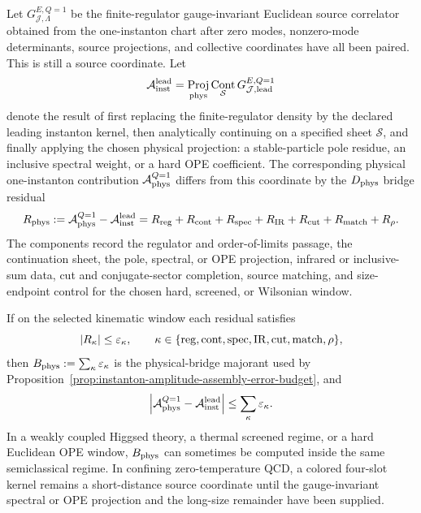 \begin{controlledapproximation}
\label{ca:instanton-euclidean-to-physical-amplitude-budget}
Let \(G^{E,Q=1}_{\mathcal J,\Lambda}\) be the finite-regulator
gauge-invariant Euclidean source correlator obtained from the one-instanton
chart after zero modes, nonzero-mode determinants, source projections, and
collective coordinates have all been paired.  This is still a source
coordinate.  Let
\[
  \mathcal A_{\rm inst}^{\rm lead}
  =
  \operatorname*{Proj}_{\rm phys}
  \operatorname*{Cont}_{\mathcal S}
  G^{E,Q=1}_{\mathcal J,{\rm lead}}
\]
denote the result of first replacing the finite-regulator density by the
declared leading instanton kernel, then analytically continuing on a specified
sheet \(\mathcal S\), and finally applying the chosen physical projection:
a stable-particle pole residue, an inclusive spectral weight, or a hard OPE
coefficient.  The corresponding physical one-instanton contribution
\(\mathcal A_{\rm phys}^{Q=1}\) differs from this coordinate by the
\(D_{\rm phys}\) bridge residual
\begin{equation}
  R_{\rm phys}
  :=
  \mathcal A_{\rm phys}^{Q=1}-\mathcal A_{\rm inst}^{\rm lead}
  =
  R_{\rm reg}
  +
  R_{\rm cont}
  +
  R_{\rm spec}
  +
  R_{\rm IR}
  +
  R_{\rm cut}
  +
  R_{\rm match}
  +
  R_{\rho}.
  \label{eq:instanton-euclidean-to-physical-residual-budget}
\end{equation}
The components record the regulator and order-of-limits passage, the
continuation sheet, the pole, spectral, or OPE projection, infrared or
inclusive-sum data, cut and conjugate-sector completion, source matching, and
size-endpoint control for the chosen hard, screened, or Wilsonian window.

If on the selected kinematic window each residual satisfies
\[
  |R_\kappa|\le \varepsilon_\kappa,
  \qquad
  \kappa\in
  \{{\rm reg},{\rm cont},{\rm spec},{\rm IR},{\rm cut},{\rm match},\rho\},
\]
then \(B_{\rm phys}:=\sum_\kappa\varepsilon_\kappa\) is the physical-bridge
majorant used by
Proposition~\ref{prop:instanton-amplitude-assembly-error-budget}, and
\begin{equation}
  \left|
  \mathcal A_{\rm phys}^{Q=1}
  -
  \mathcal A_{\rm inst}^{\rm lead}
  \right|
  \le
  \sum_\kappa\varepsilon_\kappa .
  \label{eq:instanton-physical-amplitude-residual-bound}
\end{equation}
In a weakly coupled Higgsed theory, a thermal screened regime, or a hard
Euclidean OPE window, \(B_{\rm phys}\) can sometimes be computed inside the
same semiclassical regime.  In confining zero-temperature QCD, a colored
four-slot kernel remains a short-distance source coordinate until the
gauge-invariant spectral or OPE projection and the long-size remainder have
been supplied.
\end{controlledapproximation}

